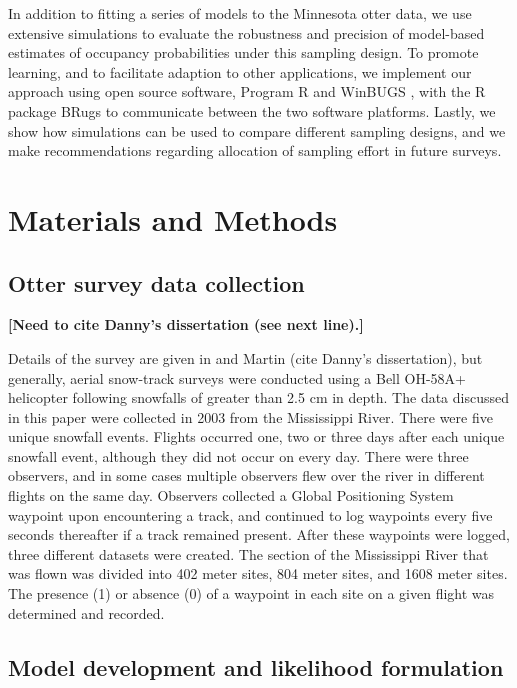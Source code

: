 \documentclass[11pt]{article}
\begin{document}
In addition to fitting a series of models to the Minnesota otter data, we use
extensive simulations to evaluate the robustness and precision of model-based
estimates of occupancy probabilities under this sampling design.  To promote
learning, and to facilitate adaption to other applications, we implement our
approach using open source software, Program R \citep{R2009} and WinBUGS
\citep{Lunn2000}, with the R package BRugs \citep{Thomas2006} to communicate
between the two software platforms.  Lastly, we show how simulations can be
used to compare different sampling designs, and we make recommendations
regarding allocation of sampling effort in future surveys.

\section{Materials and Methods}

    \subsection{Otter survey data collection}

    \textbf{[Need to cite Danny's dissertation (see next line).]}

    Details of the survey are given in \citet{Martin2003} and Martin (cite
    Danny's dissertation), but generally, aerial snow-track surveys were
    conducted using a Bell OH-58A+ helicopter following snowfalls of greater
    than 2.5 cm in depth.  The data discussed in this paper were collected in
    2003 from the Mississippi River.  There were five unique snowfall events.
    Flights occurred one, two or three days after each unique snowfall event,
    although they did not occur on every day.  There were three observers, and
    in some cases multiple observers flew over the river in different flights
    on the same day.  Observers collected a Global Positioning System waypoint
    upon encountering a track, and continued to log waypoints every five
    seconds thereafter if a track remained present.  After these waypoints were
    logged, three different datasets were created.  The section of the
    Mississippi River that was flown was divided into 402 meter sites, 804
    meter sites, and 1608 meter sites.  The presence (1) or absence (0) of a
    waypoint in each site on a given flight was determined and recorded.

    \subsection{Model development and likelihood formulation}
\end{document}
